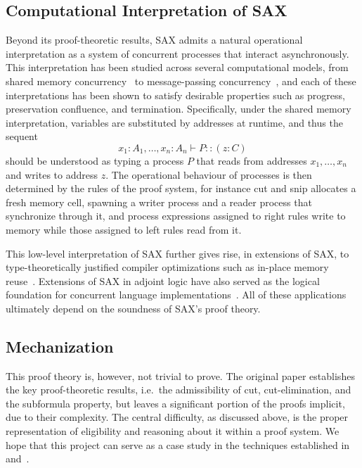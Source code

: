 \subsection{Computational Interpretation of SAX}

Beyond its proof-theoretic results, SAX admits a natural operational
interpretation as a system of concurrent processes that interact
asynchronously. This interpretation has been studied across several
computational models, from shared memory concurrency~\cite{DeYoung2020}
to message-passing concurrency~\cite{FrancalanzaTP24}, and each of these interpretations has been shown to satisfy desirable properties such as progress, preservation confluence, and termination. Specifically, under the shared memory interpretation, variables are substituted by addresses at runtime, and thus the sequent
\[
  x_1 : A_1, \ldots, x_n : A_n \vdash P :: (z : C)
\]
should be understood as typing a process $P$ that reads from addresses $x_1,
\ldots, x_n$ and writes to address $z$. The operational behaviour of processes
is then determined by the rules of the proof system, for instance cut and
snip allocates a fresh memory cell, spawning a writer process and a reader
process that synchronize through it, and process expressions assigned to right
rules write to memory while those assigned to left rules read from it.

This low-level interpretation of SAX further gives rise, in extensions of SAX,
to type-theoretically justified compiler optimizations such as in-place memory
reuse~\cite{DeYoungP23}. Extensions of SAX in adjoint logic have also served as the logical foundation for concurrent language implementations~\cite{DeYoungP23}. All of these applications ultimately depend on the soundness of SAX's proof theory.

\subsection{Mechanization}

This proof theory is, however, not trivial to prove. The original paper
establishes the key proof-theoretic results, i.e.\ the admissibility of cut,
cut-elimination, and the subformula property, but leaves a
significant portion of the proofs implicit, due to their complexity. The central
difficulty, as discussed above, is the proper representation of eligibility and reasoning about it within a proof system. We hope that this project can serve as a case study in the techniques established in~\cite{crary2009substructural} and~\cite{Sanomech}.
